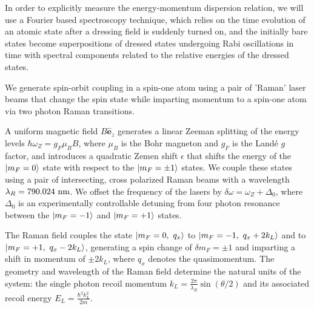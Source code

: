 In order to explicitly measure the  energy-momentum dispersion relation, we will use a Fourier based spectroscopy technique, which relies on the time evolution of an atomic state after a dressing field is suddenly turned on, and the initially bare states become superpositions of dressed states undergoing Rabi oscillations in time  with spectral components related to the relative energies of the dressed states. 


We generate spin-orbit coupling in a spin-one atom using a pair of 'Raman' laser beams that change the spin state while imparting momentum to a spin-one atom via two photon Raman transitions.  

A uniform magnetic field $B\mathbf{\hat{e}}_z$ generates a linear Zeeman splitting of the energy levels $\hbar\omega_Z=g_F\mu_BB$, where $\mu_B$ is the Bohr magneton and $g_F$ is the Land\'e $g$ factor, and introduces a quadratic Zemen shift $\epsilon$ that shifts the energy of the $|m_F=0\rangle$ state with respect to the $|m_F=\pm1\rangle$ states. We couple these states using a pair of intersecting, cross polarized Raman beams with a wavelength $\lambda_R=790.024{\ {\rm nm}}$. We offset the frequency of the lasers by $\delta\omega=\omega_Z+\Delta_0$, where $\Delta_0$ is an experimentally controllable detuning from four photon resonance between the $|m_F=-1\rangle$ and $|m_F=+1\rangle$ states. 

The Raman field couples the state $|m_F=0,\ q_x\rangle$ to $|m_F=-1,\ q_x+2k_L\rangle$ and to $|m_F=+1,\ q_x-2k_L\rangle$, generating a spin change of $\delta m_F=\pm1$ and imparting a shift in momentum of $\pm 2k_L$, where $q_x$ denotes the quasimomentum. The geometry and wavelength of the Raman field determine the natural units of the system: the single photon recoil momentum $k_L=\frac{2\pi}{\lambda_R}\sin(\theta/2)$ and its associated recoil energy $E_L=\frac{\hbar^2k_L^2}{2m}$.


